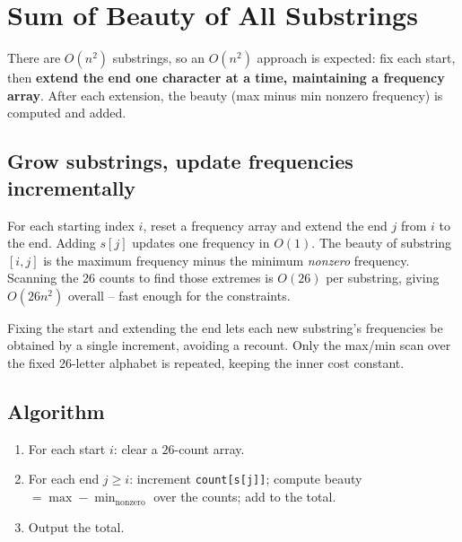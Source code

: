 \section{Sum of Beauty of All Substrings}
\label{sec:str-sum-of-beauty}


\begin{patternbox}
There are $O(n^2)$ substrings, so an $O(n^2)$ approach is expected: fix each
start, then \textbf{extend the end one character at a time, maintaining a
frequency array}. After each extension, the beauty (max minus min nonzero
frequency) is computed and added.
\end{patternbox}

\subsection*{Grow substrings, update frequencies incrementally}

For each starting index $i$, reset a frequency array and extend the end $j$
from $i$ to the end. Adding $s[j]$ updates one frequency in $O(1)$. The
beauty of substring $[i,j]$ is the maximum frequency minus the minimum
\emph{nonzero} frequency. Scanning the 26 counts to find those extremes is
$O(26)$ per substring, giving $O(26n^2)$ overall -- fast enough for the
constraints.

\begin{ideabox}
Fixing the start and extending the end lets each new substring's frequencies
be obtained by a single increment, avoiding a recount. Only the max/min scan
over the fixed 26-letter alphabet is repeated, keeping the inner cost
constant.
\end{ideabox}

\subsection*{Algorithm}

\begin{enumerate}
  \item For each start $i$: clear a $26$-count array.
  \item For each end $j\ge i$: increment \texttt{count[s[j]]}; compute
        beauty $=\max - \min_{\text{nonzero}}$ over the counts; add to the
        total.
  \item Output the total.
\end{enumerate}

